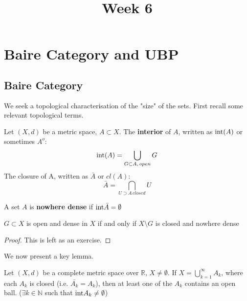 \documentclass{article}
\title{Week 6}
\begin{document}
\maketitle

\section{Baire Category and UBP}

\subsection{Baire Category}

We seek a topological characterisation of the "size" of the sets. First recall some relevant topological terms.  

\begin{definition}
    Let $(X,d)$ be a metric space, $A\subset X$.
    The \textbf{interior} of $A$, written as $\textrm{int}(A)$ or sometimes $A^o$:
    $$ \textrm{int}(A)=\bigcup_{G\subset A,\,open}G$$
    The closure of A, written as $\bar{A}$ or $cl(A)$:
    $$ \bar{A}=\bigcap_{U\supset A\,closed}U$$

\end{definition}  

\begin{definition}
    A set $A$ is \textbf{nowhere dense} if $\textrm{int}{\bar{A}}=\emptyset$
\end{definition}

\begin{proposition}
\label{complement of nowhere}
    $G \subset X$ is open and dense in $X$ if and only if $X \setminus G$ is closed and nowhere dense
\end{proposition}   

\begin{proof}
    This is left as an exercise.
\end{proof}


We now present a key lemma.   


\begin{lemma}%
\label{baire lemma}
    Let $(X,d)$ be a complete metric space over $\mathbb{R}$, $X\neq\emptyset$.    
    If $X=\bigcup_{k=1}^\infty A_k$, where each $A_k$ is closed (i.e. $\bar{A_k}=A_k$), then at least one of the $A_k$ contains an open ball. ($\exists k \in \mathbb{N}$ such that $\textrm{int}{A_k}\neq\emptyset$)  
\end{lemma}    
\end{document}
